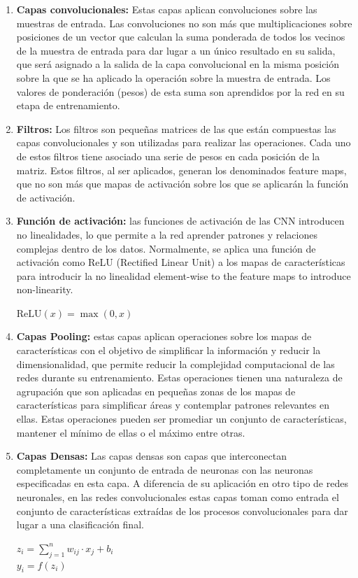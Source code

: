 \documentclass{uathesis-es}
\begin{document}
\begin{enumerate}
    \item \textbf{Capas convolucionales:} Estas capas aplican convoluciones sobre las muestras de entrada. Las convoluciones no son más que multiplicaciones sobre posiciones de un vector que calculan la suma ponderada de todos los vecinos de la muestra de entrada para dar lugar a un único resultado en su salida, que será asignado a la salida de la capa convolucional en la misma posición sobre la que se ha aplicado la operación sobre la muestra de entrada. Los valores de ponderación (pesos) de esta suma son aprendidos por la red en su etapa de entrenamiento.
    
    \item \textbf{Filtros:} Los filtros son pequeñas matrices de las que están compuestas las capas convolucionales y son utilizadas para realizar las operaciones. Cada uno de estos filtros tiene asociado una serie de pesos en cada posición de la matriz. Estos filtros, al ser aplicados, generan los denominados feature maps, que no son más que mapas de activación sobre los que se aplicarán la función de activación.
    
    \item \textbf{Función de activación:} las funciones de activación de las CNN introducen no linealidades, lo que permite a la red aprender patrones y relaciones complejas dentro de los datos. Normalmente, se aplica una función de activación como ReLU (Rectified Linear Unit) a los mapas de características para introducir la no linealidad
     element-wise to the feature maps to introduce non-linearity. \begin{center}
        $\text{ReLU}(x) = \max(0, x)$
    \end{center}
    
    \item \textbf{Capas Pooling:} estas capas aplican operaciones sobre los mapas de características con el objetivo de simplificar la información y reducir la dimensionalidad, que permite reducir la complejidad computacional de las redes durante su entrenamiento. Estas operaciones tienen una naturaleza de agrupación que son aplicadas en pequeñas zonas de los mapas de características para simplificar áreas y contemplar patrones relevantes en ellas. Estas operaciones pueden ser promediar un conjunto de características, mantener el mínimo de ellas o el máximo entre otras.
    
    \item \textbf{Capas Densas:} Las capas densas son capas que interconectan completamente un conjunto de entrada de neuronas con las neuronas especificadas en esta capa. A diferencia de su aplicación en otro tipo de redes neuronales, en las redes convolucionales estas capas toman como entrada el conjunto de características extraídas de los procesos convolucionales para dar lugar a una clasificación final.
    \begin{center}
        $z_i = \sum_{j=1}^{n} w_{ij} \cdot x_j + b_i$\\
        $y_i = f(z_i)$
    \end{center}
\end{enumerate}
\end{document}
